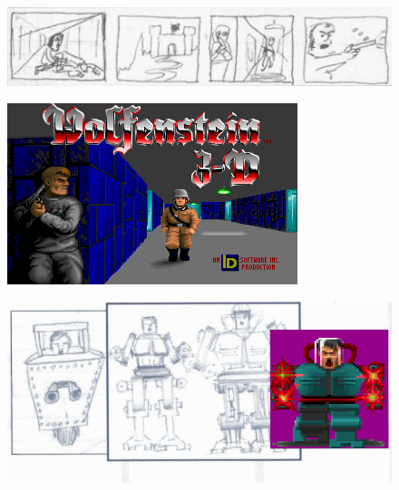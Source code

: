 \documentclass[book.tex]{subfiles}
\begin{document}
\noindent
   \begin{figure}[H]
\centering
 \includegraphics[width=\textwidth]{screenshots/sprites/tom_hall_sketch_intro_screen_genesis.png}
 \end{figure}
 \par
   \begin{figure}[H]
\centering
 \includegraphics[width=.7\textwidth]{screenshots/sprites/woldf3d.png}
\end{figure} 



\begin{figure}[H]
\centering    
     \includegraphics[width=\textwidth]{screenshots/sprites/tom_hall_sketch_adolf.png}
   \end{figure}
\end{document}
